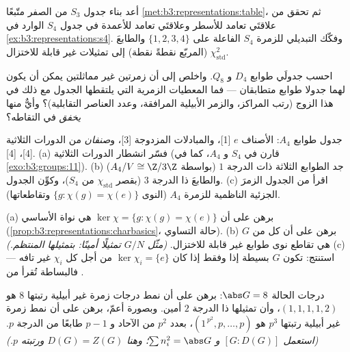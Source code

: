\begin{exercise}[$\star$]\label{exo:b3:representations:3}
أعد بناء جدول $S_3$ من الصفر متّبعًا \cref{met:b3:representations:table}، ثم تحقق من
علاقتَي تعامد للأسطر وعلاقتَي تعامد للأعمدة في جدول $S_4$ الوارد
في \cref{ex:b3:representations:s4}. وفكّك  التبديلي للزمرة $S_4$ الفاعلة على
$\{1,2,3,4\}$ والطابعَ $\chi_{\mathrm{std}}^2$ (المربّع نقطةً نقطة) إلى تمثيلات
غير قابلة للاختزال.
\end{exercise}

\begin{exercise}[$\star\star$]\label{exo:b3:representations:4}
احسب جدولَي طوابع $D_4$ و $Q_8$. واخلص إلى أن زمرتين غير مماثلتين
يمكن أن يكون لهما جدولا طوابع متطابقان --- فما المعطيات
الزمرية التي يلتقطها الجدول مع ذلك في هذا الزوج (رتب المراكز،
والزمر الأبيلية المرافقة، وعدد العناصر التقابلية)؟ وأيٌّ منها
\emph{يخفق} في التقاطه؟
\end{exercise}

\begin{exercise}[$\star\star$]\label{exo:b3:representations:5}
جدول طوابع $A_4$: الأصناف $e$ [1]، والمبادلات المزدوجة [3]،
و\emph{صنفان} من الدورات الثلاثية [4]، [4].
(a) فسّر انشطار الدورات الثلاثية (قارن  في $S_4$
و $A_4$، كما في \cref{exo:b3:groups:11}).
(b) جد الطوابع الثلاثة ذات الدرجة $1$ (بواسطة $A_4/V \cong
\Z/3\Z$) والطابعَ
ذا الدرجة $3$ (بقصر $\chi_{\mathrm{std}}$ من $S_4$)، وكوِّن الجدول.
(c) اقرأ من الجدول الزمرَ الجزئية الناظمية للزمرة $A_4$ (النوى
$\{g : \chi(g) = \chi(e)\}$ وتقاطعاتها).
\end{exercise}

\begin{exercise}[$\star\star$]\label{exo:b3:representations:6}
(a) برهن على أن $\ker\chi = \{g : \chi(g) = \chi(e)\}$ هي نواة  الأساسي (\cref{prop:b3:representations:charbasics}،
حالة التساوي).
(b) برهن على أن كل  من $G$ هي تقاطع نوى طوابع
غير قابلة للاختزال. \emph{(مثّل $G/N$ تمثيلًا أمينًا: بتمثيلها
المنتظم.)}
(c) استنتج: تكون $G$ بسيطة إذا وفقط إذا كان $\ker\chi_i = \{e\}$ من أجل كل
$\chi_i$ غير تافه  --- فالبساطة تُقرأ من .
\end{exercise}

\begin{exercise}[$\star\star$]\label{exo:b3:representations:7}
درجات الحالة $\abs G = 8$: برهن على أن نمط درجات زمرة غير أبيلية
رتبتها $8$ هو $(1,1,1,1,2)$، وأن تمثيلها ذا الدرجة $2$ أمين.
وبصورة أعمّ، برهن على أن نمط زمرة غير أبيلية رتبتها $p^3$ هو
$(1^{\,p^2},
p, \dots, p)$، بعدد $p^2$ من الآحاد و $p - 1$ طابعًا من الدرجة $p$.
\emph{(استعمل $[G : D(G)]$ و $\sum n_i^2 = \abs G$؛ وهنا $D(G) = Z(G)$ ورتبته
$p$.)}
\end{exercise}

